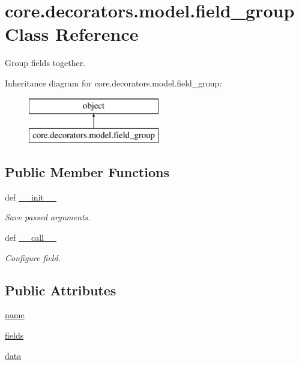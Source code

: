 \hypertarget{classcore_1_1decorators_1_1model_1_1field__group}{\section{core.\-decorators.\-model.\-field\-\_\-group Class Reference}
\label{classcore_1_1decorators_1_1model_1_1field__group}
}


Group fields together.  


Inheritance diagram for core.\-decorators.\-model.\-field\-\_\-group\-:\begin{figure}[H]
\begin{center}
\leavevmode
\includegraphics[height=2.000000cm]{classcore_1_1decorators_1_1model_1_1field__group}
\end{center}
\end{figure}
\subsection*{Public Member Functions}
\begin{DoxyCompactItemize}
\item 
def \hyperlink{classcore_1_1decorators_1_1model_1_1field__group_a5339cc227ed382399ebaad81fba6d237}{\-\_\-\-\_\-init\-\_\-\-\_\-}
\begin{DoxyCompactList}\small\item\em Save passed arguments. \end{DoxyCompactList}\item 
def \hyperlink{classcore_1_1decorators_1_1model_1_1field__group_a2d763625dfae687a30ed0ef6337c5a8f}{\-\_\-\-\_\-call\-\_\-\-\_\-}
\begin{DoxyCompactList}\small\item\em Configure field. \end{DoxyCompactList}\end{DoxyCompactItemize}
\subsection*{Public Attributes}
\begin{DoxyCompactItemize}
\item 
\hyperlink{classcore_1_1decorators_1_1model_1_1field__group_a18917138eb13e0aac794921e8b0b01c4}{name}
\item 
\hyperlink{classcore_1_1decorators_1_1model_1_1field__group_a56e0be74f7aa784b96a5d1ee25589f5c}{fields}
\item 
\hyperlink{classcore_1_1decorators_1_1model_1_1field__group_ade67e97a20f107664fd9f4d2fbddab57}{data}
\end{DoxyCompactItemize}


